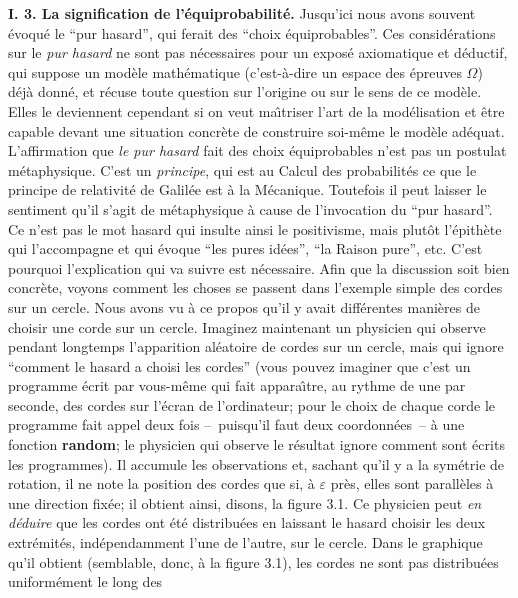 {\bf I. 3. La signification de l'\'equiprobabilit\'e.} 
\medskip  
Jusqu'ici nous avons souvent \'evoqu\'e le ``pur hasard'', qui ferait des 
``choix \'equiprobables''. Ces consid\'erations sur le {\it pur hasard} ne 
sont pas n\'ecessaires pour un expos\'e axiomatique et d\'eductif, qui 
suppose un mod\`ele math\'ematique (c'est-\`a-dire un espace des 
\'epreuves $\Omega$) d\'ej\`a donn\'e, et r\'ecuse toute question sur 
l'origine ou sur le sens de ce mod\`ele. Elles le deviennent cependant si 
on veut ma\^\i triser l'art de la mod\'elisation et \^etre capable devant 
une situation concr\`ete de construire soi-m\^eme le mod\`ele ad\'equat. 
\medskip 
L'affirmation que {\it le pur hasard} fait des choix \'equiprobables 
n'est pas un postulat m\'etaphysique. C'est un {\it principe}, qui est 
au Calcul des probabilit\'es ce que le principe de relativit\'e de  
Galil\'ee est \`a la M\'ecanique. Toutefois il peut laisser le 
sentiment qu'il s'agit de m\'etaphysique \`a cause de l'invocation du 
``pur hasard''. Ce n'est pas le mot hasard qui insulte ainsi le 
positivisme, mais plut\^ot l'\'epith\`ete qui l'accompagne et qui 
\'evoque ``les pures id\'ees'', ``la Raison pure'', etc. C'est pourquoi 
l'explication qui va suivre est n\'ecessaire. 
\medskip  
Afin que la discussion soit bien concr\`ete, voyons comment les 
choses se passent dans l'exemple  simple des  cordes sur un cercle. 
Nous avons vu \`a ce propos qu'il y avait diff\'erentes mani\`eres de 
choisir une corde sur un cercle. Imaginez maintenant un physicien 
qui observe pendant longtemps l'apparition al\'eatoire de cordes sur 
un cercle, mais qui ignore ``comment le hasard a choisi les cordes''  
(vous pouvez imaginer que c'est un programme \'ecrit par 
vous-m\^eme qui fait appara\^\i tre, au rythme de une par seconde, 
des cordes sur l'\'ecran de l'ordinateur; pour le choix de chaque corde 
le programme fait appel deux fois --~puisqu'il faut deux 
coordonn\'ees~-- \`a une fonction {\bf random}; le physicien qui 
observe le r\'esultat ignore comment sont \'ecrits les programmes). 
Il accumule les observations et, sachant qu'il y a la sym\'etrie de 
rotation, il ne note la position des cordes que si, \`a $\varepsilon$ 
pr\`es, elles sont parall\`eles  \`a une direction fix\'ee; il obtient 
ainsi, disons, la figure 3.1. Ce physicien peut {\it en d\'eduire} que les 
cordes ont \'et\'e distribu\'ees en laissant le hasard choisir les deux 
extr\'emit\'es, ind\'ependamment l'une de l'autre, sur le cercle. Dans 
le graphique qu'il obtient (semblable, donc, \`a la figure 3.1), les 
cordes ne sont pas distribu\'ees uniform\'ement le long des 
